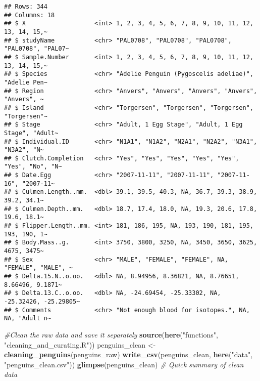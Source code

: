 \documentclass[
]{article}
\newenvironment{Shaded}{\begin{snugshade}}{\end{snugshade}}
\newcommand{\CommentTok}[1]{\textcolor[rgb]{0.56,0.35,0.01}{\textit{#1}}}
\newcommand{\FunctionTok}[1]{\textcolor[rgb]{0.13,0.29,0.53}{\textbf{#1}}}
\newcommand{\NormalTok}[1]{#1}
\newcommand{\OtherTok}[1]{\textcolor[rgb]{0.56,0.35,0.01}{#1}}
\newcommand{\StringTok}[1]{\textcolor[rgb]{0.31,0.60,0.02}{#1}}
\begin{document}
\begin{verbatim}
## Rows: 344
## Columns: 18
## $ X                   <int> 1, 2, 3, 4, 5, 6, 7, 8, 9, 10, 11, 12, 13, 14, 15,~
## $ studyName           <chr> "PAL0708", "PAL0708", "PAL0708", "PAL0708", "PAL07~
## $ Sample.Number       <int> 1, 2, 3, 4, 5, 6, 7, 8, 9, 10, 11, 12, 13, 14, 15,~
## $ Species             <chr> "Adelie Penguin (Pygoscelis adeliae)", "Adelie Pen~
## $ Region              <chr> "Anvers", "Anvers", "Anvers", "Anvers", "Anvers", ~
## $ Island              <chr> "Torgersen", "Torgersen", "Torgersen", "Torgersen"~
## $ Stage               <chr> "Adult, 1 Egg Stage", "Adult, 1 Egg Stage", "Adult~
## $ Individual.ID       <chr> "N1A1", "N1A2", "N2A1", "N2A2", "N3A1", "N3A2", "N~
## $ Clutch.Completion   <chr> "Yes", "Yes", "Yes", "Yes", "Yes", "Yes", "No", "N~
## $ Date.Egg            <chr> "2007-11-11", "2007-11-11", "2007-11-16", "2007-11~
## $ Culmen.Length..mm.  <dbl> 39.1, 39.5, 40.3, NA, 36.7, 39.3, 38.9, 39.2, 34.1~
## $ Culmen.Depth..mm.   <dbl> 18.7, 17.4, 18.0, NA, 19.3, 20.6, 17.8, 19.6, 18.1~
## $ Flipper.Length..mm. <int> 181, 186, 195, NA, 193, 190, 181, 195, 193, 190, 1~
## $ Body.Mass..g.       <int> 3750, 3800, 3250, NA, 3450, 3650, 3625, 4675, 3475~
## $ Sex                 <chr> "MALE", "FEMALE", "FEMALE", NA, "FEMALE", "MALE", ~
## $ Delta.15.N..o.oo.   <dbl> NA, 8.94956, 8.36821, NA, 8.76651, 8.66496, 9.1871~
## $ Delta.13.C..o.oo.   <dbl> NA, -24.69454, -25.33302, NA, -25.32426, -25.29805~
## $ Comments            <chr> "Not enough blood for isotopes.", NA, NA, "Adult n~
\end{verbatim}

\begin{Shaded}
\begin{Highlighting}[]
\CommentTok{\#Clean the raw data and save it separately}
\FunctionTok{source}\NormalTok{(}\FunctionTok{here}\NormalTok{(}\StringTok{"functions"}\NormalTok{, }\StringTok{"cleaning\_and\_curating.R"}\NormalTok{))}
\NormalTok{penguins\_clean }\OtherTok{\textless{}{-}} \FunctionTok{cleaning\_penguins}\NormalTok{(penguins\_raw)}
\FunctionTok{write\_csv}\NormalTok{(penguins\_clean, }\FunctionTok{here}\NormalTok{(}\StringTok{"data"}\NormalTok{, }\StringTok{"penguins\_clean.csv"}\NormalTok{))}
\FunctionTok{glimpse}\NormalTok{(penguins\_clean) }\CommentTok{\# Quick summary of clean data}
\end{Highlighting}
\end{Shaded}
\end{document}
